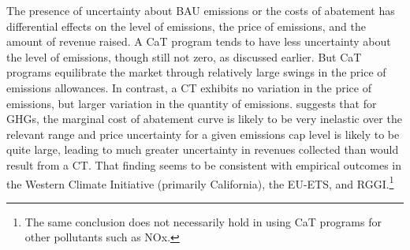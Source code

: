 \documentclass[12pt]{article}
\begin{document}
The presence of uncertainty about BAU emissions or the costs of abatement has differential effects on the level of emissions, the price of emissions, and the amount of revenue raised. A CaT program tends to have less uncertainty about the level of emissions, though still not zero, as discussed earlier. But CaT programs equilibrate the market through relatively large swings in the price of emissions allowances. In contrast, a CT exhibits no variation in the price of emissions, but larger variation in the quantity of emissions. \cite{BBWZ2019} suggests that for GHGs, the marginal cost of abatement curve is likely to be very inelastic over the relevant range and price uncertainty for a given emissions cap level is likely to be quite large, leading to much greater uncertainty in revenues collected than would result from a CT.  That finding seems to be consistent with empirical outcomes in the Western Climate Initiative (primarily California), the EU-ETS, and RGGI.\footnote{The same conclusion does not necessarily hold in using CaT programs for other pollutants such as NOx.}
\end{document}

